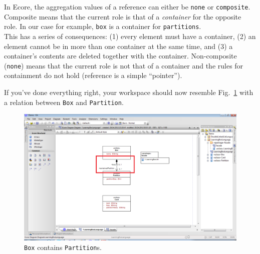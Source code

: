 In Ecore, the aggregation values of a reference can either be \texttt{none} or \texttt{com\-po\-site}.  
Composite means that the current role is that of a \emph{container} for the opposite role.  
In our case for example, \texttt{box} is a container for \texttt{partitions}.\\  
This has a series of consequences: (1) every element must have a container, (2) an element cannot be in more than one container at the same time, and (3) a container's contents are deleted together with the container.  
Non-composite (\texttt{none}) means that the current role is not that of a container and the rules for containment do not hold (reference is a simple ``pointer'').

If you've done everything right, your workspace should now resemble Fig.~\ref{fig:ereference_completed} with a relation between \texttt{Box} and \texttt{Partition}.

\begin{figure}[htbp] 
	\centering
  \includegraphics[width=\textwidth]{pics/memBoxBilder/memBox28.png}
	\caption{\texttt{Box} contains \texttt{Partition}s.}
	\label{fig:ereference_completed}
\end{figure}

